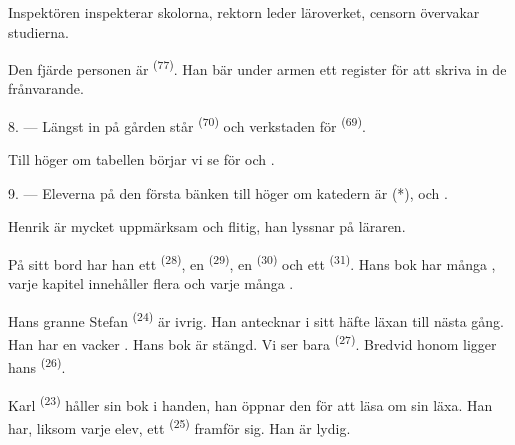 Inspektören inspekterar skolorna, rektorn leder läroverket, censorn övervakar studierna.

Den fjärde personen är  \textsuperscript{(77)}. Han bär under armen ett
register för att skriva in de frånvarande.

8. --- Längst in på gården står  \textsuperscript{(70)} och
verkstaden för  \textsuperscript{(69)}.

Till höger om tabellen börjar vi se  för  och
.


\VUsaut{2.4mm}

\VUsaut{3.0mm}

9. --- Eleverna på den första bänken till höger om katedern är  (*),
 och .

Henrik är mycket uppmärksam och flitig, han lyssnar på läraren.

På sitt bord har han ett  \textsuperscript{(28)}, en
 \textsuperscript{(29)}, en 
\textsuperscript{(30)} och ett  \textsuperscript{(31)}. Hans bok har många
, varje kapitel innehåller flera  och varje  många
.

Hans granne Stefan \textsuperscript{(24)} är ivrig. Han antecknar i sitt häfte läxan till
nästa gång. Han har en vacker . Hans bok är stängd. Vi ser bara
 \textsuperscript{(27)}. Bredvid honom ligger hans
 \textsuperscript{(26)}.

Karl \textsuperscript{(23)} håller sin bok i handen, han öppnar den för att läsa om sin läxa.
Han har, liksom varje elev, ett  \textsuperscript{(25)} framför sig. Han är
lydig.

